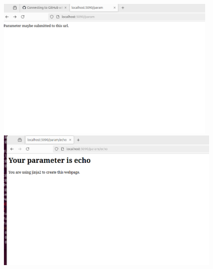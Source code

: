 \documentclass[letterpaper,11pt]{texMemo2} %
\begin{document}
	\begin{figure}[htp]
		\centering 
		
			\includegraphics[clip,width=0.9\columnwidth,height=7cm]{12}%
		\\
			\includegraphics[clip,width=0.9\columnwidth,height=7cm]{13}%
		
		
		
		
	\end{figure}
	
\end{document}

